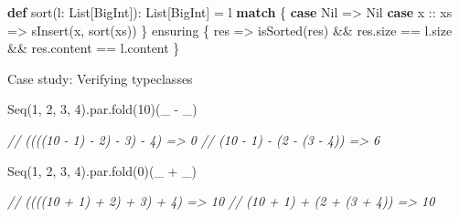 \documentclass[
  ignorenonframetext,
]{beamer}
\newenvironment{Shaded}{}{}
\newcommand{\CommentTok}[1]{\textcolor[rgb]{0.38,0.63,0.69}{\textit{#1}}}
\newcommand{\DecValTok}[1]{\textcolor[rgb]{0.25,0.63,0.44}{#1}}
\newcommand{\FunctionTok}[1]{\textcolor[rgb]{0.02,0.16,0.49}{#1}}
\newcommand{\KeywordTok}[1]{\textcolor[rgb]{0.00,0.44,0.13}{\textbf{#1}}}
\newcommand{\NormalTok}[1]{#1}
\begin{document}
\begin{frame}[fragile]

\begin{Shaded}
\begin{Highlighting}[]
\KeywordTok{def} \FunctionTok{sort}\NormalTok{(l: List[BigInt]): List[BigInt] = l }\KeywordTok{match}\NormalTok{ \{}
  \KeywordTok{case}\NormalTok{ Nil     => Nil}
  \KeywordTok{case}\NormalTok{ x :: xs => }\FunctionTok{sInsert}\NormalTok{(x, }\FunctionTok{sort}\NormalTok{(xs))}
\NormalTok{\} ensuring \{ res =>}
  \FunctionTok{isSorted}\NormalTok{(res) &&}
\NormalTok{  res.}\FunctionTok{size}\NormalTok{ == l.}\FunctionTok{size}\NormalTok{ &&}
\NormalTok{  res.}\FunctionTok{content}\NormalTok{ == l.}\FunctionTok{content}
\NormalTok{\}}
\end{Highlighting}
\end{Shaded}

\end{frame}

\begin{frame}[fragile]{Case study: Verifying typeclasses}
\protect\hypertarget{case-study-verifying-typeclasses}{}

\begin{Shaded}
\begin{Highlighting}[]
\NormalTok{Seq(}\DecValTok{1}\NormalTok{, }\DecValTok{2}\NormalTok{, }\DecValTok{3}\NormalTok{, }\DecValTok{4}\NormalTok{).}\FunctionTok{par}\NormalTok{.}\FunctionTok{fold}\NormalTok{(}\DecValTok{10}\NormalTok{)(_ - _)}

\CommentTok{// ((((10 - 1) - 2) - 3) - 4) => 0}
\CommentTok{// (10 - 1) - (2 - (3 - 4))   => 6}
\end{Highlighting}
\end{Shaded}

\end{frame}

\begin{frame}[fragile]

\begin{Shaded}
\begin{Highlighting}[]
\NormalTok{Seq(}\DecValTok{1}\NormalTok{, }\DecValTok{2}\NormalTok{, }\DecValTok{3}\NormalTok{, }\DecValTok{4}\NormalTok{).}\FunctionTok{par}\NormalTok{.}\FunctionTok{fold}\NormalTok{(}\DecValTok{0}\NormalTok{)(_ + _)}

\CommentTok{// ((((10 + 1) + 2) + 3) + 4) => 10}
\CommentTok{// (10 + 1) + (2 + (3 + 4))   => 10}
\end{Highlighting}
\end{Shaded}

\end{frame}
\end{document}
